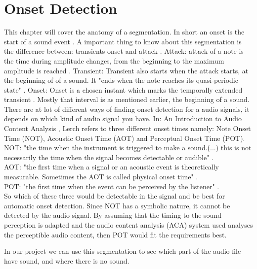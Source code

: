 \section{Onset Detection}
This chapter  will cover the anatomy of a segmentation.
In short an onset is the start of a sound event \citep{ACA}. 
A important thing to know about this segmentation is the difference between: transients onset and attack \citep{Bello2005}.
Attack: attack of a note is the time during amplitude changes, from the beginning to the maximum amplitude is reached \citep{ACA}.
Transient: Transient also starts when the attack starts, at the beginning of of a sound\citep{Bello2005}. It "ends when the note reaches its quasi-periodic state" \citep{ACA}.
Onset: Onset is a chosen instant which marks the temporally extended transient \citep{Bello2005}. Mostly that interval is as mentioned earlier, the beginning of a sound. 
\\
There are at lot of different ways of finding onset detection for a audio signals, it depends on which kind of audio signal you have\citep{Bello2005}. 
In: An Introduction to Audio Content Analysis \citep{ACA}, Lerch refers to three different onset times namely: Note Onset Time (NOT), Acoustic Onset Time (AOT) and Perceptual Onset Time (POT)\citep{ACA}.
\\
NOT: "the time when the instrument is triggered to make a sound.(...) this is not necessarily the time when the signal becomes detectable or audible" \citep{ACA}.
\\
AOT: "the first time when a signal or an acoustic event is theoretically measurable. Sometimes the AOT is called physical onset time" \citep{ACA}.
\\
POT: "the first time when the event can be perceived by the
listener" \citep{ACA}.
\\
So which of these three would be detectable in the signal and be best for automatic onset detection. Since NOT has a symbolic nature, it cannot be detected by the audio signal\cite{ACA}. By assuming that the timing to the sound perception is adapted and the audio content analysis (ACA) system used analyses the perceptible audio content, then POT would fit the requirements best\cite{ACA}.

In our project we can use this segmentation to see which part of the audio file have sound, and where there is no sound. 
